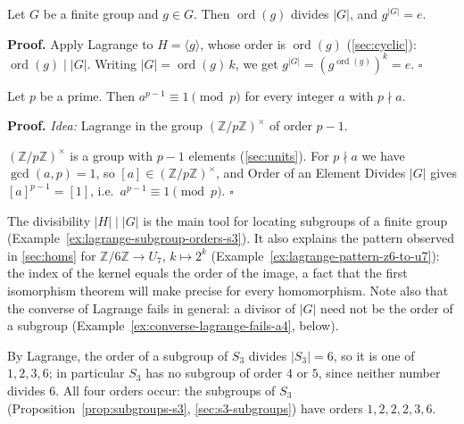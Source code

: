 \documentclass[11pt]{report}
\renewenvironment{proof}[1][Proof]{\noindent\textbf{#1.} }{\hfill$\square$\par\vspace{5pt}}
\begin{document}
\begin{corbox}[{Order of an Element Divides $|G|$; $g^{|G|} = e$}]\label{cor:order-element-divides-g-g-g-e}
Let $G$ be a finite group and $g \in G$. Then $\operatorname{ord}(g)$ divides $|G|$, and $g^{|G|} = e$.
\end{corbox}

\begin{proof}
Apply Lagrange to $H = \langle g \rangle$, whose order is $\operatorname{ord}(g)$ (\ref{sec:cyclic}): $\operatorname{ord}(g) \mid |G|$. Writing $|G| = \operatorname{ord}(g)\,k$, we get $g^{|G|} = (g^{\operatorname{ord}(g)})^k = e$.
\end{proof}

\begin{corbox}\label{cor:fermats-little-theorem}
Let $p$ be a prime. Then $a^{p-1} \equiv 1 \pmod p$ for every integer $a$ with $p \nmid a$.
\end{corbox}

\begin{proof}
\textit{Idea:} Lagrange in the group $(\mathbb{Z}/p\mathbb{Z})^\times$ of order $p - 1$.\par
$(\mathbb{Z}/p\mathbb{Z})^\times$ is a group with $p - 1$ elements (\ref{sec:units}). For $p \nmid a$ we have $\gcd(a, p) = 1$, so $[a] \in (\mathbb{Z}/p\mathbb{Z})^\times$, and Order of an Element Divides $|G|$ gives $[a]^{p-1} = [1]$, i.e.\ $a^{p-1} \equiv 1 \pmod p$.
\end{proof}

\begin{rembox}\label{rem:uses-lagrange}
The divisibility $|H| \mid |G|$ is the main tool for locating subgroups of a finite group (Example~\ref{ex:lagrange-subgroup-orders-s3}). It also explains the pattern observed in \ref{sec:homs} for $\mathbb{Z}/6\mathbb{Z} \to U_7$, $k \mapsto 2^k$ (Example~\ref{ex:lagrange-pattern-z6-to-u7}): the index of the kernel equals the order of the image, a fact that the first isomorphism theorem will make precise for every homomorphism. Note also that the converse of Lagrange fails in general: a divisor of $|G|$ need not be the order of a subgroup (Example~\ref{ex:converse-lagrange-fails-a4}, below).
\end{rembox}

\begin{exbox}\label{ex:lagrange-subgroup-orders-s3}
By Lagrange, the order of a subgroup of $S_3$ divides $|S_3| = 6$, so it is one of $1, 2, 3, 6$; in particular $S_3$ has no subgroup of order $4$ or $5$, since neither number divides $6$. All four orders occur: the subgroups of $S_3$ (Proposition~\ref{prop:subgroups-s3}, \ref{sec:s3-subgroups}) have orders $1, 2, 2, 2, 3, 6$.
\end{exbox}
\end{document}
